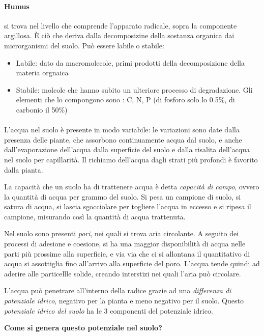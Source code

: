 \documentclass[a4paper,12pt]{book}
\begin{document}
\paragraph{Humus} si trova nel livello che comprende l'apparato radicale, sopra la componente argillosa. È ciò che deriva dalla decomposizine della sostanza organica dai microrganismi del suolo. Può essere labile o stabile:
\begin{itemize}
\item{Labile: dato da macromolecole, primi prodotti della decomposizione della materia orgnaica}
\item{Stabile: molcole che hanno subito un ulteriore processo di degradazione. Gli elementi che lo compongono sono : C, N, P (di fosforo solo lo 0.5\%, di carbonio il 50\%)}
\end{itemize}

\paragraph{}
L'acqua nel suolo è presente in modo variabile: le variazioni sono date dalla presenza delle piante, che assorbono continuamente acqua dal suolo, e anche dall'evaporazione dell'acqua dalla superficie del suolo e dalla risalita dell'acqua nel suolo per capillarità. Il richiamo dell'acqua dagli strati più profondi è favorito dalla pianta.

La capacità che un suolo ha di trattenere acqua è detta \emph{capacità di campo}, ovvero la quantità di acqua per grammo del suolo. Si pesa un campione di suolo, si satura di acqua, si lascia sgocciolare per togliere l'acqua in eccesso e si ripesa il campione, misurando così la quantità di acqua trattenuta. 

Nel suolo sono presenti \emph{pori}, nei quali si trova aria circolante. A seguito dei processi di adesione e coesione, si ha una maggior disponibilità di acqua nelle parti più prossime alla superficie, e via via che ci si allontana il quantitativo di acqua si assottiglia fino all'arrivo alla superficie del poro. L'acqua tende quindi ad aderire alle particellle solide, creando interstizi nei quali l'aria può circolare.

L'acqua può penetrare all'interno della radice grazie ad una \emph{differenza di potenziale idrico}, negativo per la pianta e meno negativo per il suolo. Questo \emph{potenziale idrico del suolo} ha le 3 componenti del potenziale idrico. 
 
\textbf{Come si genera questo potenziale nel suolo?}
\end{document}
